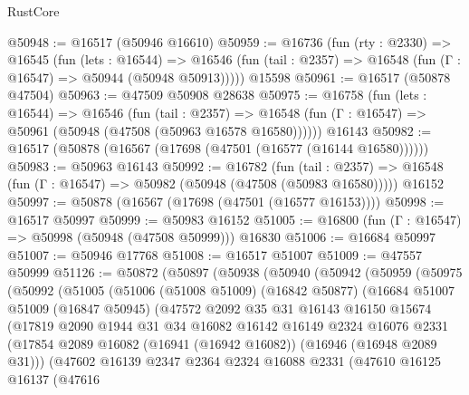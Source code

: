 \begin{lexlean}{RustCore}
\begin{coremodule}
@50948 := @16517 (@50946 @16610)
@50959 := @16736
    (fun (rty : @2330) =>
    @16545
      (fun (lets : @16544) =>
      @16546 (fun (tail : @2357) => @16548 (fun (Γ : @16547) => @50944 (@50948 @50913)))))
    @15598
@50961 := @16517 (@50878 @47504)
@50963 := @47509 @50908 @28638
@50975 := @16758
    (fun (lets : @16544) =>
    @16546
      (fun (tail : @2357) =>
      @16548 (fun (Γ : @16547) => @50961 (@50948 (@47508 (@50963 @16578 @16580))))))
    @16143
@50982 := @16517 (@50878 (@16567 (@17698 (@47501 (@16577 (@16144 @16580))))))
@50983 := @50963 @16143
@50992 := @16782
    (fun (tail : @2357) => @16548 (fun (Γ : @16547) => @50982 (@50948 (@47508 (@50983 @16580)))))
    @16152
@50997 := @50878 (@16567 (@17698 (@47501 (@16577 @16153))))
@50998 := @16517 @50997
@50999 := @50983 @16152
@51005 := @16800 (fun (Γ : @16547) => @50998 (@50948 (@47508 @50999))) @16830
@51006 := @16684 @50997
@51007 := @50946 @17768
@51008 := @16517 @51007
@51009 := @47557 @50999
@51126 := @50872
    (@50897
      (@50938
        (@50940
          (@50942
            (@50959
              (@50975
                (@50992
                  (@51005
                    (@51006
                      (@51008 @51009)
                      (@16842 @50877)
                      (@16684
                        @51007
                        @51009
                        (@16847 @50945)
                        (@47572
                          @2092
                          @35
                          @31
                          @16143
                          @16150
                          @15674
                          (@17819
                            @2090
                            @1944
                            @31
                            @34
                            @16082
                            @16142
                            @16149
                            @2324
                            @16076
                            @2331
                            (@17854
                              @2089
                              @16082
                              (@16941 (@16942 @16082))
                              (@16946 (@16948 @2089 @31)))
                            (@47602
                              @16139
                              @2347
                              @2364
                              @2324
                              @16088
                              @2331
                              (@47610
                                @16125
                                @16137
                                (@47616

\end{coremodule}
\end{lexlean}
